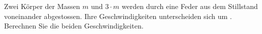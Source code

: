 Zwei Körper der Massen $m$ und $3\cdot m$ werden durch eine Feder aus dem Stillstand voneinander abgestossen. Ihre Geschwindigkeiten unterscheiden sich um \vDiO. Berechnen Sie die beiden Geschwindigkeiten.
